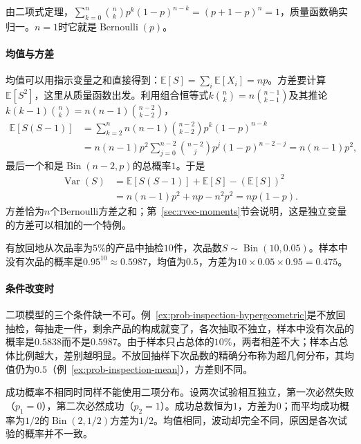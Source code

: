 由二项式定理，$\sum_{k=0}^n\binom nkp^k(1-p)^{n-k}=(p+1-p)^n=1$，质量函数确实归一。$n=1$时它就是$\operatorname{Bernoulli}(p)$。

\paragraph{均值与方差}
均值可以用指示变量之和直接得到：$\mathbb{E}[S]=\sum_i\mathbb{E}[X_i]=np$。方差要计算$\mathbb{E}[S^2]$，这里从质量函数出发。利用组合恒等式$k\binom nk=n\binom{n-1}{k-1}$及其推论$k(k-1)\binom nk=n(n-1)\binom{n-2}{k-2}$，
\[
  \begin{aligned}
  \mathbb{E}[S(S-1)]&=\sum_{k=2}^nn(n-1)\binom{n-2}{k-2}p^k(1-p)^{n-k}\\
  &=n(n-1)p^2\sum_{j=0}^{n-2}\binom{n-2}{j}p^j(1-p)^{n-2-j}=n(n-1)p^2,
  \end{aligned}
\]
最后一个和是$\operatorname{Bin}(n-2,p)$的总概率$1$。于是
\[
  \begin{aligned}
  \operatorname{Var}(S)&=\mathbb{E}[S(S-1)]+\mathbb{E}[S]-(\mathbb{E}[S])^2\\
  &=n(n-1)p^2+np-n^2p^2=np(1-p).
  \end{aligned}
\]
方差恰为$n$个Bernoulli方差之和；第~\ref{sec:rvec-moments}节会说明，这是独立变量的方差可以相加的一个特例。

\begin{example}[有放回抽检]
\label{ex:prob-inspection-binomial}
有放回地从次品率为$5\%$的产品中抽检$10$件，次品数$S\sim\operatorname{Bin}(10,0.05)$。样本中没有次品的概率是$0.95^{10}\approx0.5987$，均值为$0.5$，方差为$10\times0.05\times0.95=0.475$。
\end{example}

\paragraph{条件改变时}
二项模型的三个条件缺一不可。例~\ref{ex:prob-inspection-hypergeometric}是不放回抽检，每抽走一件，剩余产品的构成就变了，各次抽取不独立，样本中没有次品的概率是$0.5838$而不是$0.5987$。由于样本只占总体的$10\%$，两者相差不大；样本占总体比例越大，差别越明显。不放回抽样下次品数的精确分布称为超几何分布，其均值仍为$0.5$（例~\ref{ex:prob-inspection-mean}），方差则不同。

成功概率不相同时同样不能使用二项分布。设两次试验相互独立，第一次必然失败（$p_1=0$），第二次必然成功（$p_2=1$）。成功总数恒为$1$，方差为$0$；而平均成功概率为$1/2$的$\operatorname{Bin}(2,1/2)$方差为$1/2$。均值相同，波动却完全不同，原因是各次试验的概率并不一致。

